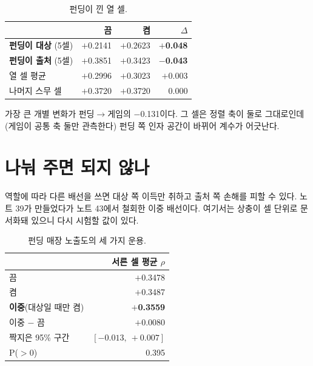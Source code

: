 \documentclass[10pt]{article}
\begin{document}
\begin{table}[t]
\centering\tsize
\caption{펀딩이 낀 열 셀.}
\begin{tabular}{lrrr}
\toprule
& 끔 & 켬 & $\Delta$ \\
\midrule
\textbf{펀딩이 대상} (5셀) & $+$0.2141 & $+$0.2623 & \textbf{$+$0.048} \\
\textbf{펀딩이 출처} (5셀) & $+$0.3851 & $+$0.3423 & \textbf{$-$0.043} \\
\midrule
열 셀 평균 & $+$0.2996 & $+$0.3023 & $+$0.003 \\
나머지 스무 셀 & $+$0.3720 & $+$0.3720 & 0.000 \\
\bottomrule
\end{tabular}
\end{table}


가장 큰 개별 변화가 펀딩$\to$게임의 $-$0.131이다. 그 셀은 정렬 축이 둘로
그대로인데(게임이 공통 축 둘만 관측한다) 펀딩 쪽 인자 공간이 바뀌어 계수가
어긋난다.

\section{나눠 주면 되지 않나}

역할에 따라 다른 배선을 쓰면 대상 쪽 이득만 취하고 출처 쪽 손해를 피할 수 있다.
노트 39가 만들었다가 노트 43에서 철회한 이중 배선이다. 여기서는 상충이 셀
단위로 문서화돼 있으니 다시 시험할 값이 있다.

\begin{table}[t]
\centering\tsize
\caption{펀딩 매장 노출도의 세 가지 운용.}
\begin{tabular}{lr}
\toprule
& 서른 셀 평균 $\rho$ \\
\midrule
끔 & $+$0.3478 \\
켬 & $+$0.3487 \\
\textbf{이중}(대상일 때만 켬) & \textbf{$+$0.3559} \\
\midrule
이중 $-$ 끔 & $+$0.0080 \\
짝지은 95\% 구간 & $[-0.013,\ +0.007]$ \\
P($>$0) & 0.395 \\
\bottomrule
\end{tabular}
\end{table}
\end{document}
